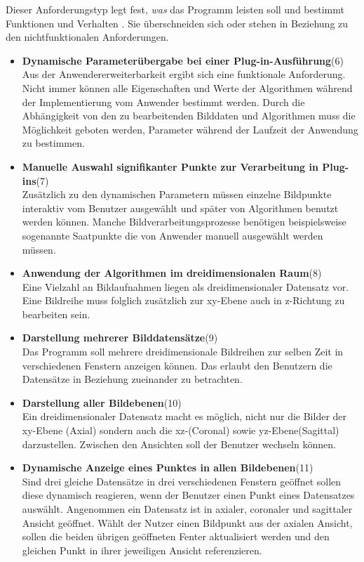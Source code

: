 Dieser Anforderungstyp legt fest, \textit{was} das Programm leisten soll und bestimmt Funktionen und Verhalten \cite[9]{balzert:swa}. Sie überschneiden sich oder stehen in Beziehung zu den nichtfunktionalen Anforderungen.

\begin{itemize}
\item \textbf{Dynamische Parameterübergabe bei einer Plug-in-Ausführung}(6)\\
		Aus der Anwendererweiterbarkeit ergibt sich eine funktionale Anforderung. Nicht immer können alle Eigenschaften und Werte der Algorithmen während der Implementierung vom Anwender bestimmt werden. Durch die Abhängigkeit von den zu bearbeitenden Bilddaten und Algorithmen muss die Möglichkeit geboten werden, Parameter während der Laufzeit der Anwendung zu bestimmen.

\item \textbf{Manuelle Auswahl signifikanter Punkte zur Verarbeitung in Plug-ins}(7)\\
		Zusätzlich zu den dynamischen Parametern müssen einzelne Bildpunkte interaktiv vom Benutzer ausgewählt und später von Algorithmen benutzt werden können. Manche Bildverarbeitungsprozesse benötigen beispielsweise sogenannte Saatpunkte die von Anwender manuell ausgewählt werden müssen.

\item \textbf{Anwendung der Algorithmen im dreidimensionalen Raum}(8)\\
	  Eine Vielzahl an Bildaufnahmen liegen als dreidimensionaler Datensatz vor. Eine Bildreihe muss folglich zusätzlich zur xy-Ebene auch in z-Richtung zu bearbeiten sein.

\item \textbf{Darstellung mehrerer Bilddatensätze}(9)\\
	Das Programm soll mehrere dreidimensionale Bildreihen zur selben Zeit in verschiedenen Fenstern anzeigen können. Das erlaubt den Benutzern die Datensätze in Beziehung zueinander zu betrachten.

\item \textbf{Darstellung aller Bildebenen}(10)\\
	  Ein dreidimensionaler Datensatz macht es möglich, nicht nur die Bilder der xy-Ebene (Axial) sondern auch die xz-(Coronal) sowie yz-Ebene(Sagittal) darzustellen. Zwischen den Ansichten soll der Benutzer wechseln können.

\item \textbf{Dynamische Anzeige eines Punktes in allen Bildebenen}(11)\\
	  Sind drei gleiche Datensätze in drei verschiedenen Fenstern geöffnet sollen diese dynamisch reagieren, wenn der Benutzer einen Punkt eines Datensatzes auswählt. Angenommen ein Datensatz ist in axialer, coronaler und sagittaler Ansicht geöffnet. Wählt der Nutzer einen Bildpunkt aus der axialen Ansicht, sollen die beiden übrigen geöffneten Fenter aktualisiert werden und den gleichen Punkt in ihrer jeweiligen Ansicht referenzieren.
	  

\end{itemize}

